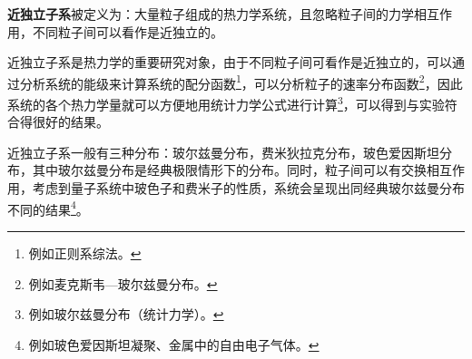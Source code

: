 

\textbf{近独立子系}被定义为：大量粒子组成的热力学系统，且忽略粒子间的力学相互作用，不同粒子间可以看作是近独立的。

近独立子系是热力学的重要研究对象，由于不同粒子间可看作是近独立的，可以通过分析系统的能级来计算系统的配分函数\footnote{例如正则系综法。}，可以分析粒子的速率分布函数\footnote{例如麦克斯韦—玻尔兹曼分布。}，因此系统的各个热力学量就可以方便地用统计力学公式进行计算\footnote{例如玻尔兹曼分布（统计力学）。}，可以得到与实验符合得很好的结果。

近独立子系一般有三种分布：玻尔兹曼分布，费米狄拉克分布，玻色爱因斯坦分布，其中玻尔兹曼分布是经典极限情形下的分布。同时，粒子间可以有交换相互作用，考虑到量子系统中玻色子和费米子的性质，系统会呈现出同经典玻尔兹曼分布不同的结果\footnote{例如玻色爱因斯坦凝聚、金属中的自由电子气体。}。
